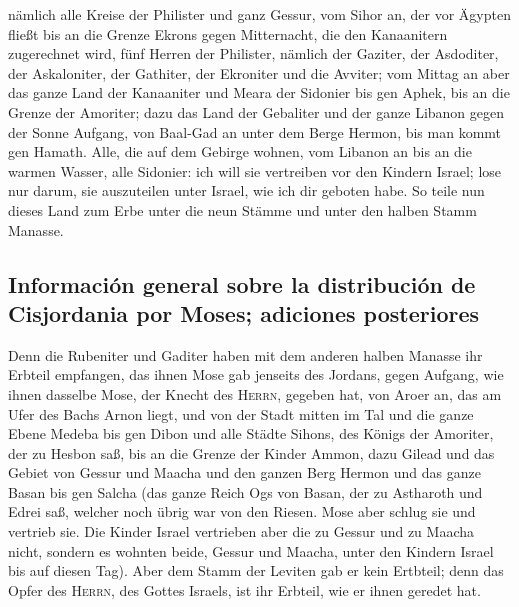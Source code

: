  nämlich alle Kreise der Philister und ganz Gessur,
 vom Sihor an, der vor Ägypten fließt bis an die Grenze
Ekrons gegen Mitternacht, die den Kanaanitern zugerechnet wird, fünf
Herren der Philister, nämlich der Gaziter, der Asdoditer, der
Askaloniter, der Gathiter, der Ekroniter und die Avviter; 
vom Mittag an aber das ganze Land der Kanaaniter und Meara der Sidonier
bis gen Aphek, bis an die Grenze der Amoriter;  dazu das
Land der Gebaliter und der ganze Libanon gegen der Sonne Aufgang, von
Baal-Gad an unter dem Berge Hermon, bis man kommt gen Hamath.
 Alle, die auf dem Gebirge wohnen, vom Libanon an bis an
die warmen Wasser, alle Sidonier: ich will sie vertreiben vor den
Kindern Israel; lose nur darum, sie auszuteilen unter Israel, wie ich
dir geboten habe.  So teile nun dieses Land zum Erbe unter
die neun Stämme und unter den halben Stamm Manasse.

\hypertarget{informaciuxf3n-general-sobre-la-distribuciuxf3n-de-cisjordania-por-moses-adiciones-posteriores}{%
\subsection{Información general sobre la distribución de Cisjordania por
Moses; adiciones
posteriores}\label{informaciuxf3n-general-sobre-la-distribuciuxf3n-de-cisjordania-por-moses-adiciones-posteriores}}

 Denn die Rubeniter und Gaditer haben mit dem anderen
halben Manasse ihr Erbteil empfangen, das ihnen Mose gab jenseits des
Jordans, gegen Aufgang, wie ihnen dasselbe Mose, der Knecht des
\textsc{Herrn}, gegeben hat,  von Aroer an, das am Ufer
des Bachs Arnon liegt, und von der Stadt mitten im Tal und die ganze
Ebene Medeba bis gen Dibon  und alle Städte Sihons, des
Königs der Amoriter, der zu Hesbon saß, bis an die Grenze der Kinder
Ammon,  dazu Gilead und das Gebiet von Gessur und Maacha
und den ganzen Berg Hermon und das ganze Basan bis gen Salcha
 (das ganze Reich Ogs von Basan, der zu Astharoth und
Edrei saß, welcher noch übrig war von den Riesen. Mose aber schlug sie
und vertrieb sie.  Die Kinder Israel vertrieben aber die
zu Gessur und zu Maacha nicht, sondern es wohnten beide, Gessur und
Maacha, unter den Kindern Israel bis auf diesen Tag). 
Aber dem Stamm der Leviten gab er kein Ertbteil; denn das Opfer des
\textsc{Herrn}, des Gottes Israels, ist ihr Erbteil, wie er ihnen
geredet hat.

